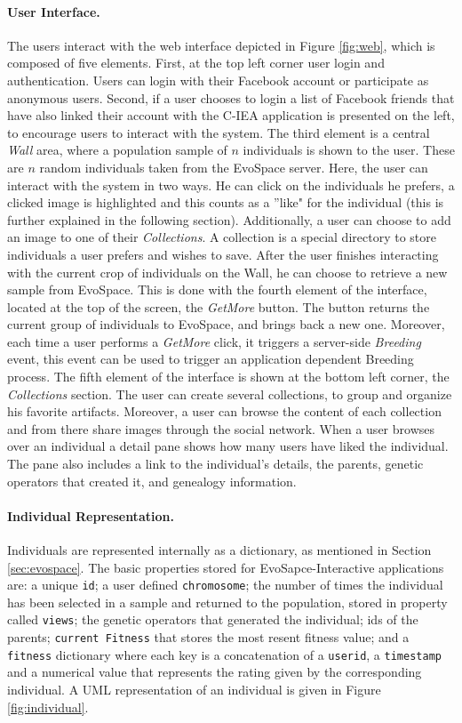 \documentclass{llncs}
\begin{document}
\paragraph{User Interface.}
The users interact with the web interface depicted in Figure \ref{fig:web}, which is composed of five elements.
First, at the top left corner user login and authentication.
Users can login with their Facebook account or participate as anonymous users.
Second, if a user chooses to login a list of Facebook friends that have also linked their account with the C-IEA application is presented on the left, to encourage users to interact with the system. The third element is a central \emph{ Wall } area, where a population sample of $n$ individuals is shown to the user.
These are $n$ random individuals taken from the EvoSpace server.
Here, the user can interact with the system in two ways.
He can click on the individuals he prefers, a clicked image is highlighted and this counts as a ''like" for the individual
(this is further explained in the following section).
Additionally, a user can choose to add an image to one of their \emph{Collections}.
A collection is a special directory to store individuals a user prefers and wishes to save. After the user finishes interacting with the current crop of individuals on the Wall, he can choose to retrieve a new sample from EvoSpace.
This is done with the fourth element of the interface, located at the top of the screen, the \emph{GetMore} button.
The button returns the current group of individuals to EvoSpace, and brings back a new one.
Moreover, each time a user performs a \emph{GetMore} click, it triggers a server-side \emph{Breeding} event,
this event can be used to trigger an application dependent Breeding process. The fifth element of the interface is shown at the bottom left corner, the \emph{Collections} section.
The user can create several collections, to group and organize his favorite artifacts.
Moreover, a user can browse the content of each collection and from there share images through the social network.
When a user browses over an individual a detail pane shows how many users have liked the individual.
The pane also includes a link to the individual's details, the parents, genetic operators that created it, and genealogy information.

\paragraph{Individual Representation.}
Individuals are represented internally as a dictionary, as mentioned in Section \ref{sec:evospace}.
The basic properties stored for EvoSapce-Interactive applications are: a unique \texttt{id}; a user defined \texttt{chromosome};
the number of times the individual has been selected in a sample and returned to the population, stored in property called \texttt{views};
the genetic operators that generated the individual; ids of the parents; \texttt{current Fitness} that stores the most resent fitness value;
and a \texttt{fitness} dictionary where each key is a concatenation of a \texttt{userid}, a \texttt{timestamp} and a numerical value that represents
the rating given by the corresponding individual.
A UML representation of an individual is given in Figure \ref{fig:individual}.
\end{document}
